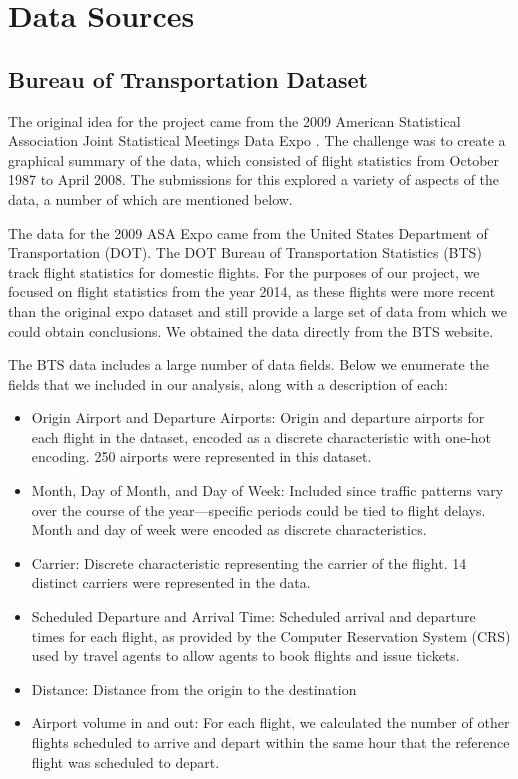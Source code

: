 \documentclass{article}
\begin{document}
\section{Data Sources}

\label{sec:data-sources}
\subsection{Bureau of Transportation Dataset}

The original idea for the project came from the 2009 American Statistical Association Joint Statistical Meetings Data Expo \citep{wickham2011asa}.
The challenge was to create a graphical summary of the data, which consisted of flight statistics from October 1987 to April 2008.
The submissions for this explored a variety of aspects of the data, a number of which are mentioned below.

The data for the 2009 ASA Expo came from the United States Department of Transportation (DOT).
The DOT Bureau of Transportation Statistics (BTS) track flight statistics for domestic flights. 
For the purposes of our project, we focused on flight statistics from the year 2014, as these flights were more recent than the original expo dataset and still provide a large set of data from which we could obtain conclusions. 
We obtained the data directly from the BTS website.

The BTS data includes a large number of data fields. Below we enumerate the fields that we included in our analysis, along with a description of each:

\begin{itemize}
\item Origin Airport and Departure Airports: Origin and departure airports for each flight in the dataset, encoded as a discrete characteristic with one-hot encoding. 250 airports were represented in this dataset.
\item Month, Day of Month, and Day of Week: Included since traffic patterns vary over the course of the year---specific periods could be tied to flight delays. Month and day of week were encoded as discrete characteristics.
\item Carrier: Discrete characteristic representing the carrier of the flight. 14 distinct carriers were represented in the data.
\item Scheduled Departure and Arrival Time: Scheduled arrival and departure times for each flight, as provided by the Computer Reservation System (CRS) used by travel agents to allow agents to book flights and issue tickets.
\item Distance: Distance from the origin to the destination
\item Airport volume in and out: For each flight, we calculated the number of other flights scheduled to arrive and depart within the same hour that the reference flight was scheduled to depart. 
\end{itemize}
\end{document}
